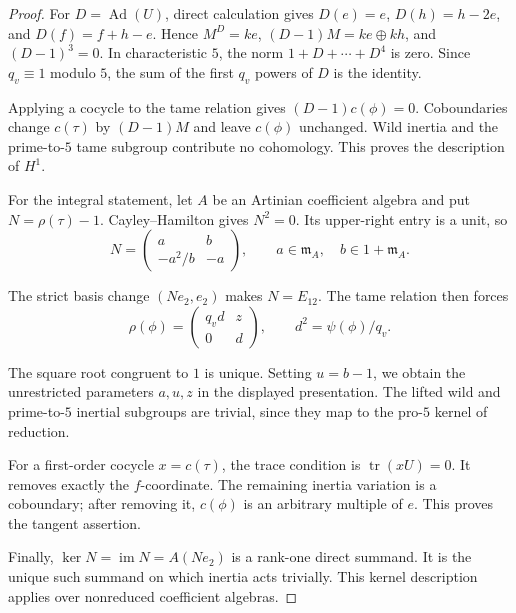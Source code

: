 \documentclass[11pt,a4paper]{article}
\numberwithin{equation}{section}
\begin{document}
\begin{proof}
For \(D=\operatorname{Ad}(U)\), direct calculation gives \(D(e)=e\), \(D(h)=h-2e\), and \(D(f)=f+h-e\). Hence \(M^D=ke\), \((D-1)M=ke\oplus kh\), and \((D-1)^3=0\). In characteristic \(5\), the norm \(1+D+\cdots+D^4\) is zero. Since \(q_v\equiv1\) modulo \(5\), the sum of the first \(q_v\) powers of \(D\) is the identity.

Applying a cocycle to the tame relation gives \((D-1)c(\phi)=0\). Coboundaries change \(c(\tau)\) by \((D-1)M\) and leave \(c(\phi)\) unchanged. Wild inertia and the prime-to-\(5\) tame subgroup contribute no cohomology. This proves the description of \(H^1\).

For the integral statement, let \(A\) be an Artinian coefficient algebra and put \(N=\rho(\tau)-1\). Cayley--Hamilton gives \(N^2=0\). Its upper-right entry is a unit, so
\begin{equation*}
N=\begin{pmatrix}a&b\\-a^2/b&-a\end{pmatrix},
\qquad a\in\mathfrak m_A,\quad b\in1+\mathfrak m_A.
\end{equation*}

The strict basis change \((Ne_2,e_2)\) makes \(N=E_{12}\). The tame relation then forces
\begin{equation*}
\rho(\phi)=\begin{pmatrix}q_vd&z\\0&d\end{pmatrix},
\qquad d^2=\psi(\phi)/q_v.
\end{equation*}

The square root congruent to \(1\) is unique. Setting \(u=b-1\), we obtain the unrestricted parameters \(a,u,z\) in the displayed presentation. The lifted wild and prime-to-\(5\) inertial subgroups are trivial, since they map to the pro-\(5\) kernel of reduction.

For a first-order cocycle \(x=c(\tau)\), the trace condition is \(\operatorname{tr}(xU)=0\). It removes exactly the \(f\)-coordinate. The remaining inertia variation is a coboundary; after removing it, \(c(\phi)\) is an arbitrary multiple of \(e\). This proves the tangent assertion.

Finally, \(\ker N=\operatorname{im}N=A(Ne_2)\) is a rank-one direct summand. It is the unique such summand on which inertia acts trivially. This kernel description applies over nonreduced coefficient algebras.
\end{proof}
\end{document}
